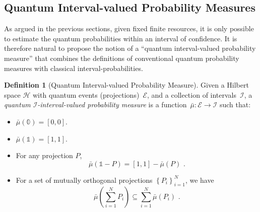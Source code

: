\documentclass[12pt]{iopart}
\theoremstyle{plain}
\theoremstyle{definition}
\newtheorem{definition}[thm]{Definition}
\newcommand{\Hilb}{\mathcal{H}}
\newcommand{\events}{\ensuremath{\mathcal{E}}}
\begin{document}
\subsection{Quantum Interval-valued Probability Measures}

As argued in the previous sections, given fixed finite resources,
it is only possible to estimate the quantum probabilities within an
interval of confidence. It is therefore natural to propose the notion
of a ``quantum interval-valued probability measure'' that combines
the definitions of conventional quantum probability measures with
classical interval-probabilities.

\begin{definition}[Quantum Interval-valued Probability Measure]\label{def:QuantumInterval-valuedProbability}
Given a Hilbert space $\Hilb$ with quantum events (projections)~$\events$,
and a collection of intervals~$\mathscr{I}$, a \emph{quantum $\mathscr{I}$-interval-valued
probability measure} is a function~$\bar{\mu}:\events\rightarrow\mathscr{I}$
such that: 
\begin{itemize}
\item $\bar{\mu}(\mathbb{0})=\left[0,0\right]$. 
\item $\bar{\mu}(\mathbb{1})=\left[1,1\right]$. 
\item For any projection $P$, 
\begin{equation}
\bar{\mu}\left(\mathbb{1}-P\right)=\left[1,1\right]-\bar{\mu}\left(P\right)\textrm{ .}\label{eq:QuantumInterval-valuedProbability-Complement}
\end{equation}
\item For a set of mutually orthogonal projections $\left\{ P_{i}\right\} _{i=1}^{N}$,
we have 
\begin{equation}
\bar{\mu}\left(\sum_{i=1}^{N}P_{i}\right)\subseteq\sum_{i=1}^{N}\bar{\mu}\left(P_{i}\right)\textrm{ .}\label{eq:QuantumInterval-valuedProbability-Inclusion}
\end{equation}
\end{itemize}
\end{definition}
\end{document}
